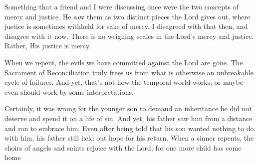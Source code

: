 \documentclass[12pt]{article}[titlepage]
\newcommand{\1}{\={a}}
\newcommand{\2}{\={e}}
\newcommand{\3}{\={\i}}
\newcommand{\4}{\=o}
\newcommand{\5}{\=u}
\newcommand{\6}{\={A}}
\renewcommand{\,}{\textsuperscript{,}}
\begin{document}
Something that a friend and I were discussing once were the two concepts of mercy and justice.
He saw them as two distinct pieces the Lord gives out, where justice is sometimes withheld for sake of mercy.
I disagreed with that then, and disagree with it now.
There is no weighing scales in the Lord's mercy and justice.
Rather, His justice is mercy.

When we repent, the evils we have committed against the Lord are gone.
The Sacrament of Reconciliation truly frees us from what is otherwise an unbreakable cycle of failures.
And yet, that's not how the temporal world works, or maybe even should work by some interpretations.

Certainly, it was wrong for the younger son to demand an inheritance he did not deserve and spend it on a life of sin.
And yet, his father saw him from a distance and ran to embrace him.
Even after being told that his son wanted nothing to do with him, his father still held out hope for his return.
When a sinner repents, the choirs of angels and saints rejoice with the Lord, for one more child has come home
\end{document}
